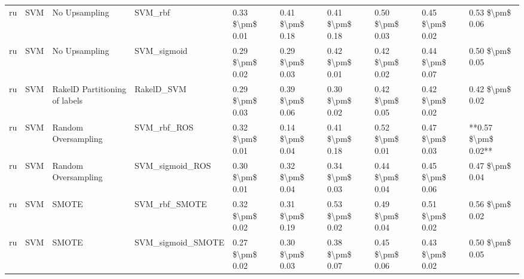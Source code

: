 \begin{tabular}{llllllllll}
      ru &                             SVM &                 No Upsampling &                                      SVM\_rbf & 0.33 \$\textbackslash pm\$ 0.01 &           0.41 \$\textbackslash pm\$ 0.18 &       0.41 \$\textbackslash pm\$ 0.18 &        0.50 \$\textbackslash pm\$ 0.03 &                         0.45 \$\textbackslash pm\$ 0.02 &     0.53 \$\textbackslash pm\$ 0.06 \\
      ru &                             SVM &                 No Upsampling &                                  SVM\_sigmoid & 0.29 \$\textbackslash pm\$ 0.02 &           0.29 \$\textbackslash pm\$ 0.03 &       0.42 \$\textbackslash pm\$ 0.01 &        0.42 \$\textbackslash pm\$ 0.02 &                         0.44 \$\textbackslash pm\$ 0.07 &     0.50 \$\textbackslash pm\$ 0.05 \\
      ru &                             SVM & RakelD Partitioning of labels &                                   RakelD\_SVM & 0.29 \$\textbackslash pm\$ 0.03 &           0.39 \$\textbackslash pm\$ 0.06 &       0.30 \$\textbackslash pm\$ 0.02 &        0.42 \$\textbackslash pm\$ 0.05 &                         0.42 \$\textbackslash pm\$ 0.02 &     0.42 \$\textbackslash pm\$ 0.02 \\
      ru &                             SVM &           Random Oversampling &                                  SVM\_rbf\_ROS & 0.32 \$\textbackslash pm\$ 0.01 &           0.14 \$\textbackslash pm\$ 0.04 &       0.41 \$\textbackslash pm\$ 0.18 &        0.52 \$\textbackslash pm\$ 0.01 &                         0.47 \$\textbackslash pm\$ 0.03 & **0.57 \$\textbackslash pm\$ 0.02** \\
      ru &                             SVM &           Random Oversampling &                              SVM\_sigmoid\_ROS & 0.30 \$\textbackslash pm\$ 0.01 &           0.32 \$\textbackslash pm\$ 0.04 &       0.34 \$\textbackslash pm\$ 0.03 &        0.44 \$\textbackslash pm\$ 0.04 &                         0.45 \$\textbackslash pm\$ 0.06 &     0.47 \$\textbackslash pm\$ 0.04 \\
      ru &                             SVM &                         SMOTE &                                SVM\_rbf\_SMOTE & 0.32 \$\textbackslash pm\$ 0.02 &           0.31 \$\textbackslash pm\$ 0.19 &       0.53 \$\textbackslash pm\$ 0.02 &        0.49 \$\textbackslash pm\$ 0.04 &                         0.51 \$\textbackslash pm\$ 0.02 &     0.56 \$\textbackslash pm\$ 0.02 \\
      ru &                             SVM &                         SMOTE &                            SVM\_sigmoid\_SMOTE & 0.27 \$\textbackslash pm\$ 0.02 &           0.30 \$\textbackslash pm\$ 0.03 &       0.38 \$\textbackslash pm\$ 0.07 &        0.45 \$\textbackslash pm\$ 0.06 &                         0.43 \$\textbackslash pm\$ 0.02 &     0.50 \$\textbackslash pm\$ 0.05 \\

\end{tabular}
